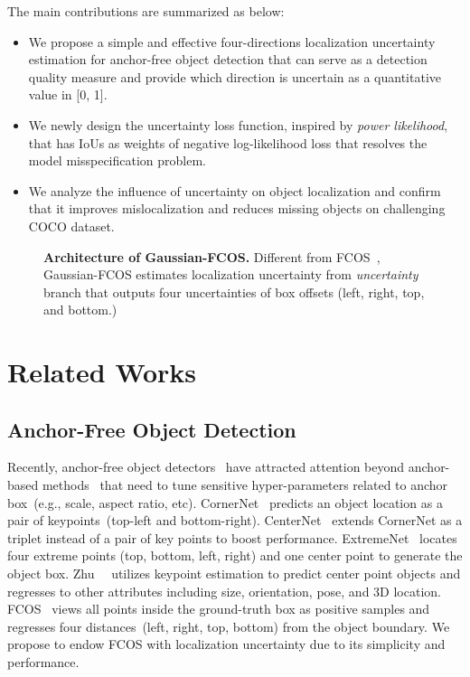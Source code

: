\documentclass[final]{cvpr}
\begin{document}
The main contributions are summarized as below:

\begin{itemize}
\item We propose a simple and effective four-directions localization uncertainty estimation for anchor-free object detection that can serve as a detection quality measure and provide which direction is uncertain as a quantitative value in [0, 1].
\item We newly design the uncertainty loss function, inspired by \textit{power likelihood}, that has IoUs as weights of negative log-likelihood loss that resolves the model misspecification problem.
\item We analyze the influence of uncertainty on object localization and confirm that it improves mislocalization and reduces missing objects on challenging COCO dataset.
\end{itemize}




\begin{figure*}[t]
\centering
{}
  \caption{\textbf{ Architecture of Gaussian-FCOS.} 
Different from FCOS~\cite{Tian_2019_ICCV}, Gaussian-FCOS estimates localization uncertainty from \textit{uncertainty} branch that outputs four uncertainties of box offsets (left, right, top, and bottom.)}
\label{fig:architecture}
\vspace{-0.3cm}
\end{figure*}




\section{Related Works}
\subsection{Anchor-Free Object Detection}
Recently, anchor-free object detectors~\cite{law2018cornernet,zhou2019bottom,Duan_2019_ICCV,zhou2019objects,Tian_2019_ICCV} have attracted attention beyond anchor-based methods~\cite{ren2015faster,lin2018focal,cai2018cascade,zhang2018single} that need to tune sensitive hyper-parameters related to anchor box~(e.g., scale, aspect ratio, etc).
CornerNet~\cite{law2018cornernet} predicts an object location as a pair of keypoints~(top-left and bottom-right).
CenterNet~\cite{Duan_2019_ICCV} extends CornerNet as a triplet instead of a pair of key points to boost performance.
ExtremeNet~\cite{zhou2019bottom} locates four extreme points (top, bottom, left, right) and one center point to generate the object box.
Zhu~\etal~\cite{zhou2019objects} utilizes keypoint estimation to predict center point objects and regresses to other attributes including size, orientation, pose, and 3D location.
FCOS~\cite{Tian_2019_ICCV} views all points inside the ground-truth box as positive samples and regresses four distances~(left, right, top, bottom) from the object boundary.
We propose to endow FCOS with localization uncertainty due to its simplicity and performance.
\end{document}
